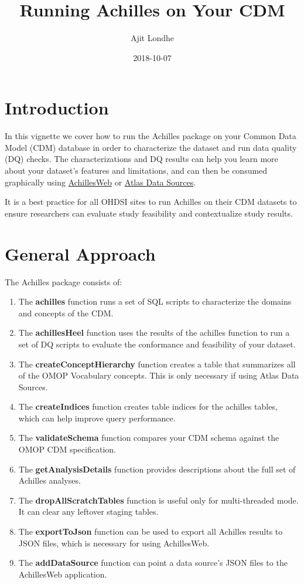 \documentclass[]{article}
\title{Running Achilles on Your CDM}
\author{Ajit Londhe}
\date{2018-10-07}
\providecommand{\tightlist}{%
  \setlength{\itemsep}{0pt}\setlength{\parskip}{0pt}}
\begin{document}
\maketitle

{
\setcounter{tocdepth}{2}
\tableofcontents
}
\section{Introduction}\label{introduction}

In this vignette we cover how to run the Achilles package on your Common
Data Model (CDM) database in order to characterize the dataset and run
data quality (DQ) checks. The characterizations and DQ results can help
you learn more about your dataset's features and limitations, and can
then be consumed graphically using
\href{https://github.com/OHDSI/AchillesWeb}{AchillesWeb} or
\href{https://github.com/OHDSI/Atlas}{Atlas Data Sources}.

It is a best practice for all OHDSI sites to run Achilles on their CDM
datasets to ensure researchers can evaluate study feasibility and
contextualize study results.

\section{General Approach}\label{general-approach}

The Achilles package consists of:

\begin{enumerate}
\def\labelenumi{\arabic{enumi}.}
\tightlist
\item
  The \textbf{achilles} function runs a set of SQL scripts to
  characterize the domains and concepts of the CDM.
\item
  The \textbf{achillesHeel} function uses the results of the achilles
  function to run a set of DQ scripts to evaluate the conformance and
  feasibility of your dataset.
\item
  The \textbf{createConceptHierarchy} function creates a table that
  summarizes all of the OMOP Vocabulary concepts. This is only necessary
  if using Atlas Data Sources.
\item
  The \textbf{createIndices} function creates table indices for the
  achilles tables, which can help improve query performance.
\item
  The \textbf{validateSchema} function compares your CDM schema against
  the OMOP CDM specification.
\item
  The \textbf{getAnalysisDetails} function provides descriptions about
  the full set of Achilles analyses.
\item
  The \textbf{dropAllScratchTables} function is useful only for
  multi-threaded mode. It can clear any leftover staging tables.
\item
  The \textbf{exportToJson} function can be used to export all Achilles
  results to JSON files, which is necessary for using AchillesWeb.
\item
  The \textbf{addDataSource} function can point a data source's JSON
  files to the AchillesWeb application.
\end{enumerate}
\end{document}
